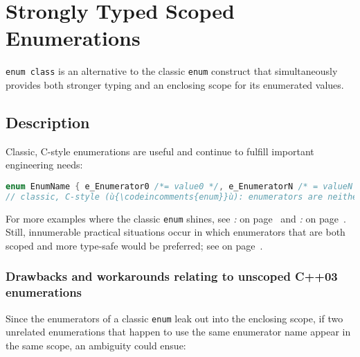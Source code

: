 \newpage
\section[{\tt enum}~{\tt class}]{Strongly Typed Scoped Enumerations}\label{enumclass}


\texttt{enum}~\texttt{class} is an alternative to the classic
\texttt{enum} construct that simultaneously provides both stronger
typing and an enclosing scope for its enumerated values.

\subsection[Description]{Description}\label{description-enumclass}

Classic, C-style enumerations are useful and continue to fulfill
important engineering needs:

\begin{lstlisting}[language=C++]
enum EnumName { e_Enumerator0 /*= value0 */, e_EnumeratorN /* = valueN */ };
// classic, C-style (ù{\codeincomments{enum}}ù): enumerators are neither type-safe nor scoped
\end{lstlisting}

\noindent For more examples where the classic \texttt{enum} shines, see \textit{: } on page~\pageref{strong-typing-of-an-enum-class-can-be-counterproductive} and \textit{: } on page~\pageref{scoped-enumerations-do-not-necessarily-add-value}. Still,
innumerable practical situations occur in which enumerators that are
both scoped and more type-safe would be preferred; see \textit{} on page~\pageref{introducing-the-c++11-enum-class}.

\subsubsection[Drawbacks and workarounds relating to unscoped C++03 enumerations]{Drawbacks and workarounds relating to unscoped C++03 enumerations}\label{drawbacks-and-workarounds-relating-to-unscoped-c++03-enumerations}

Since the enumerators of a classic \texttt{enum} leak out into the
enclosing scope, if two unrelated enumerations that happen to use the
same enumerator name appear in the same scope, an ambiguity could ensue:

